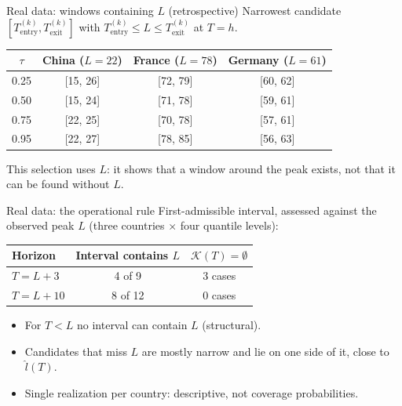 \documentclass[aspectratio=54,10pt]{beamer}
\begin{document}
\begin{frame}{Real data: windows containing $L$ (retrospective)}
\centering
Narrowest candidate $[T_{\mathrm{entry}}^{(k)},T_{\mathrm{exit}}^{(k)}]$ with $T_{\mathrm{entry}}^{(k)}\le L\le T_{\mathrm{exit}}^{(k)}$ at $T=h$.
\vspace{0.3cm}

\begin{tabular}{cccc}
	\toprule
	$\tau$ & China ($L=22$) & France ($L=78$) & Germany ($L=61$) \\
	\midrule
	0.25 & [15, 26] & [72, 79] & [60, 62] \\
	0.50 & [15, 24] & [71, 78] & [59, 61] \\
	0.75 & [22, 25] & [70, 78] & [57, 61] \\
	0.95 & [22, 27] & [78, 85] & [56, 63] \\
	\bottomrule
\end{tabular}
\vspace{0.3cm}

\small This selection uses $L$: it shows that a window around the peak exists, not that it can be found without $L$.
\end{frame}


\begin{frame}{Real data: the operational rule}
\justifying
First-admissible interval, assessed against the observed peak $L$
(three countries $\times$ four quantile levels):
\begin{center}
	\begin{tabular}{lcc}
		\toprule
		Horizon & Interval contains $L$ & $\mathcal K(T)=\emptyset$ \\
		\midrule
		$T=L+3$  & 4 of 9   & 3 cases \\
		$T=L+10$ & 8 of 12  & 0 cases \\
		\bottomrule
	\end{tabular}
\end{center}
\begin{itemize}
	\item For $T<L$ no interval can contain $L$ (structural).
	\item Candidates that miss $L$ are mostly narrow and lie on one side of it, close to $\hat l(T)$.
	\item Single realization per country: descriptive, not coverage probabilities.
\end{itemize}
\end{frame}
\end{document}
